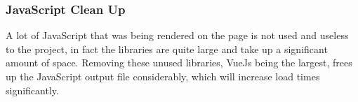 \subsubsection{JavaScript Clean Up}
A lot of JavaScript that was being rendered on the page is not used and useless to the project, in fact the libraries are quite large and take up a significant amount of space. Removing these unused libraries, VueJs being the largest, frees up the JavaScript output file considerably, which will increase load times significantly.
\newpage

